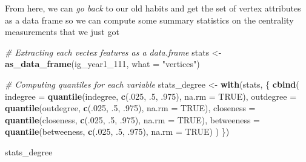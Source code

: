 \documentclass[]{book}
\newenvironment{Shaded}{\begin{snugshade}}{\end{snugshade}}
\newcommand{\CommentTok}[1]{\textcolor[rgb]{0.56,0.35,0.01}{\textit{#1}}}
\newcommand{\DataTypeTok}[1]{\textcolor[rgb]{0.13,0.29,0.53}{#1}}
\newcommand{\DecValTok}[1]{\textcolor[rgb]{0.00,0.00,0.81}{#1}}
\newcommand{\FloatTok}[1]{\textcolor[rgb]{0.00,0.00,0.81}{#1}}
\newcommand{\KeywordTok}[1]{\textcolor[rgb]{0.13,0.29,0.53}{\textbf{#1}}}
\newcommand{\NormalTok}[1]{#1}
\newcommand{\OperatorTok}[1]{\textcolor[rgb]{0.81,0.36,0.00}{\textbf{#1}}}
\newcommand{\OtherTok}[1]{\textcolor[rgb]{0.56,0.35,0.01}{#1}}
\newcommand{\StringTok}[1]{\textcolor[rgb]{0.31,0.60,0.02}{#1}}
\begin{document}
\begin{Shaded}
\end{Shaded}

From here, we can \emph{go back} to our old habits and get the set of vertex attributes as a data frame so we can compute some summary statistics on the centrality measurements that we just got

\begin{Shaded}
\begin{Highlighting}[]
\CommentTok{# Extracting each vectex features as a data.frame}
\NormalTok{stats <-}\StringTok{ }\KeywordTok{as_data_frame}\NormalTok{(ig_year1_}\DecValTok{111}\NormalTok{, }\DataTypeTok{what =} \StringTok{"vertices"}\NormalTok{)}

\CommentTok{# Computing quantiles for each variable}
\NormalTok{stats_degree <-}\StringTok{ }\KeywordTok{with}\NormalTok{(stats, \{}
 \KeywordTok{cbind}\NormalTok{(}
   \DataTypeTok{indegree   =} \KeywordTok{quantile}\NormalTok{(indegree, }\KeywordTok{c}\NormalTok{(.}\DecValTok{025}\NormalTok{, }\FloatTok{.5}\NormalTok{, }\FloatTok{.975}\NormalTok{), }\DataTypeTok{na.rm =} \OtherTok{TRUE}\NormalTok{),}
   \DataTypeTok{outdegree  =} \KeywordTok{quantile}\NormalTok{(outdegree, }\KeywordTok{c}\NormalTok{(.}\DecValTok{025}\NormalTok{, }\FloatTok{.5}\NormalTok{, }\FloatTok{.975}\NormalTok{), }\DataTypeTok{na.rm =} \OtherTok{TRUE}\NormalTok{),}
   \DataTypeTok{closeness  =} \KeywordTok{quantile}\NormalTok{(closeness, }\KeywordTok{c}\NormalTok{(.}\DecValTok{025}\NormalTok{, }\FloatTok{.5}\NormalTok{, }\FloatTok{.975}\NormalTok{), }\DataTypeTok{na.rm =} \OtherTok{TRUE}\NormalTok{),}
   \DataTypeTok{betweeness =} \KeywordTok{quantile}\NormalTok{(betweeness, }\KeywordTok{c}\NormalTok{(.}\DecValTok{025}\NormalTok{, }\FloatTok{.5}\NormalTok{, }\FloatTok{.975}\NormalTok{), }\DataTypeTok{na.rm =} \OtherTok{TRUE}\NormalTok{)}
\NormalTok{ )}
\NormalTok{\})}

\NormalTok{stats_degree}
\end{Highlighting}
\end{Shaded}
\end{document}
